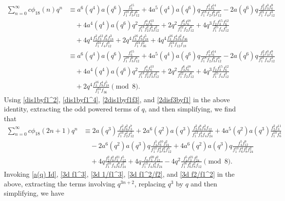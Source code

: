 \documentclass[12pt]{article}
\numberwithin{equation}{section}
\theoremstyle{plain}
\numberwithin{theorem}{section}
\theoremstyle{definition}
\theoremstyle{remark}
\begin{document}
    \begin{align*}
       \sum_{n=0}^\infty c\phi_{18}(n)q^n&\equiv a^6(q^4) a(q^6)\frac{f_6^{15}}{f_1^{18} f_3^6 f_{12}^6}+4 a^5(q^4) a(q^6) q \frac{f_4^2 f_6^{14}}{f_1^{18} f_2 f_3^6 f_{12}^4}-2 a(q^6) q\frac{f_2^2 f_3^3 f_6^9}{f_1^{21} f_4 f_{12}^3}\\&\quad+4 a^4(q^4) a(q^6) q^2\frac{f_4^4 f_6^{13}}{f_1^{18} f_2^2 f_3^6 f_{12}^2}+2 q^2\frac{f_3^6 f_6^{18}}{f_1^{22} f_2 f_{12}^6}+4q^3\frac{f_2 f_3^{15} f_6^{12}}{f_1^{25} f_4 f_{12}^3}\\&\quad+4q^4\frac{f_2^2 f_3^{12} f_6^8 f_{18}^3}{f_1^{24} f_4 f_{12}^3}+2q^4\frac{f_3^{16} f_9^4 f_{18}^5}{f_1^{24} f_{36}^2}+4q^4\frac{f_3^{16} f_9^4 f_6^2 f_{36}}{f_1^{24} f_{12} f_{18}}\\
       &\equiv a^6(q^4) a(q^6)\frac{f_6^{15}}{f_1^{18} f_3^6 f_{12}^6}+4 a^5(q^4) a(q^6) q \frac{f_4^2 f_6^{14}}{f_1^{18} f_2 f_3^6 f_{12}^4}-2 a(q^6) q\frac{f_2^2 f_3^3 f_6^9}{f_1^{21} f_4 f_{12}^3}\\&\quad+4 a^4(q^4) a(q^6) q^2\frac{f_4^4 f_6^{13}}{f_1^{18} f_2^2 f_3^6 f_{12}^2}+2 q^2\frac{f_3^6 f_6^{18}}{f_1^{22} f_2 f_{12}^6}+4q^3\frac{f_2 f_3^{15} f_6^{12}}{f_1^{25} f_4 f_{12}^3}\\&\quad+2q^4\frac{f_3^{16} f_9^4 f_{18}^5}{f_1^{24} f_{36}}\pmod8.
    \end{align*}
    Using \eqref{dis1byf1^2}, \eqref{dis1byf1^4}, \eqref{2dis1byf1f3}, and \eqref{2disf3byf1} in the above identity, extracting the odd powered terms of $q$, and then simplifying, we find that
    \begin{align*}
         \sum_{n=0}^\infty c\phi_{18}(2n+1)q^n&\equiv 2a(q^3)\frac{f_4^2 f_6^2 f_3^7}{f_1^{10} f_2^2 f_{12}^2}+2 a^6(q^2) a(q^3) \frac{f_2^2 f_6^8 f_8^2 f_{12}}{f_1^{13} f_3^4 f_4 f_{24}^2}+4 a^5(q^2) a(q^3) \frac{f_2^2 f_3^{11}}{f_1^{10} f_6^4}\\&\quad-2a^6(q^2) a(q^3) q\frac{f_4^5 f_6^{10} f_{24}^2}{f_1^{13} f_3^4 f_8^2 f_{12}^5}+4 a^6(q^2) a(q^3)q\frac{f_4^5 f_{12}^9}{f_1^{13} f_6^4 f_8^2 f_{24}^2}\\&\quad+4q\frac{f_2^2 f_8^2 f_3^{21} f_{12}^5}{f_1^{16} f_4 f_6^8 f_{24}^2}+4q\frac{f_8  f_3^{20} f_{12}^2}{f_1^{13} f_4 f_6^4 f_{24}}-4q^2\frac{f_4^5 f_3^{21} f_{24}^2}{f_1^{16} f_6^6 f_8^2 f_{12}}\pmod8 .
    \end{align*}
    Invoking \eqref{a(q) Id}, \eqref{3d f1^3}, \eqref{3d 1/f1^3}, \eqref{3d f1^2/f2}, and \eqref{3d f2/f1^2} in the above, extracting the terms involving $q^{3n+2}$, replacing $q^3$ by $q$ and then simplifying, we have
\end{document}
